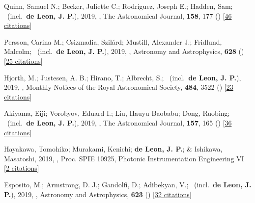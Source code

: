 \item[{\color{numcolor}\scriptsize15}] Quinn, Samuel N.; Becker, Juliette C.; Rodriguez, Joseph E.; Hadden, Sam; \etal\ (incl.\ \textbf{de Leon, J. P.}), 2019, , The Astronomical Journal, \textbf{158}, 177 () [\href{https://ui.adsabs.harvard.edu/abs/2019AJ....158..177Q}{46 citations}]

\item[{\color{numcolor}\scriptsize14}] Persson, Carina M.; Csizmadia, Szil{\'a}rd; Mustill, Alexander J.; Fridlund, Malcolm; \etal\ (incl.\ \textbf{de Leon, J. P.}), 2019, , Astronomy and Astrophysics, \textbf{628} () [\href{https://ui.adsabs.harvard.edu/abs/2019A&A...628A..64P}{25 citations}]

\item[{\color{numcolor}\scriptsize13}] Hjorth, M.; Justesen, A. B.; Hirano, T.; Albrecht, S.; \etal\ (incl.\ \textbf{de Leon, J. P.}), 2019, , Monthly Notices of the Royal Astronomical Society, \textbf{484}, 3522 () [\href{https://ui.adsabs.harvard.edu/abs/2019MNRAS.484.3522H}{23 citations}]

\item[{\color{numcolor}\scriptsize12}] Akiyama, Eiji; Vorobyov, Eduard I.; Liu, Hauyu Baobabu; Dong, Ruobing; \etal\ (incl.\ \textbf{de Leon, J. P.}), 2019, , The Astronomical Journal, \textbf{157}, 165 () [\href{https://ui.adsabs.harvard.edu/abs/2019AJ....157..165A}{36 citations}]

\item[{\color{numcolor}\scriptsize11}] Hayakawa, Tomohiko; Murakami, Kenichi; \textbf{de Leon, J. P.}; \& Ishikawa, Masatoshi, 2019, , Proc. SPIE 10925, Photonic Instrumentation Engineering VI [\href{https://www.spiedigitallibrary.org/conference-proceedings-of-spie/10925/1092507/Focus-adjustable-motion-blur-compensation-method-using-deformable-mirror/10.1117/12.2509567.short}{2 citations}]

\item[{\color{numcolor}\scriptsize10}] Esposito, M.; Armstrong, D. J.; Gandolfi, D.; Adibekyan, V.; \etal\ (incl.\ \textbf{de Leon, J. P.}), 2019, , Astronomy and Astrophysics, \textbf{623} () [\href{https://ui.adsabs.harvard.edu/abs/2019A&A...623A.165E}{32 citations}]

